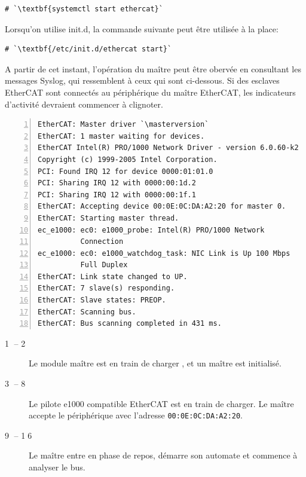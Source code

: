 \documentclass[a4paper,12pt,BCOR=6mm,bibtotoc,idxtotoc]{scrbook}
\newcommand{\masterversion}{1.5.2}
\newcommand{\linenum}[1]{\normalfont\textcircled{\tiny #1}}
\begin{document}
\begin{lstlisting}
# `\textbf{systemctl start ethercat}`
\end{lstlisting}

Lorsqu'on utilise init.d, la commande suivante peut \^etre utilis\'ee
\`a la place:

\begin{lstlisting}
# `\textbf{/etc/init.d/ethercat start}`
\end{lstlisting}

A partir de cet instant, l'op\'eration du ma\^itre peut \^etre oberv\'ee
en consultant les messages Syslog, qui ressemblent \`a
ceux qui sont ci-dessous. Si des esclaves EtherCAT sont connect\'es
au p\'eriph\'erique du ma\^itre EtherCAT, les indicateurs d'activit\'e
devraient commencer \`a clignoter.

\begin{lstlisting}[numbers=left]
EtherCAT: Master driver `\masterversion`
EtherCAT: 1 master waiting for devices.
EtherCAT Intel(R) PRO/1000 Network Driver - version 6.0.60-k2
Copyright (c) 1999-2005 Intel Corporation.
PCI: Found IRQ 12 for device 0000:01:01.0
PCI: Sharing IRQ 12 with 0000:00:1d.2
PCI: Sharing IRQ 12 with 0000:00:1f.1
EtherCAT: Accepting device 00:0E:0C:DA:A2:20 for master 0.
EtherCAT: Starting master thread.
ec_e1000: ec0: e1000_probe: Intel(R) PRO/1000 Network
          Connection
ec_e1000: ec0: e1000_watchdog_task: NIC Link is Up 100 Mbps
          Full Duplex
EtherCAT: Link state changed to UP.
EtherCAT: 7 slave(s) responding.
EtherCAT: Slave states: PREOP.
EtherCAT: Scanning bus.
EtherCAT: Bus scanning completed in 431 ms.
\end{lstlisting}

\begin{description}

\item[\linenum{1} -- \linenum{2}] Le module ma\^itre est en train de charger , et un ma\^itre est initialis\'e.

\item[\linenum{3} -- \linenum{8}] Le pilote e1000 compatible EtherCAT
  est en train de charger. Le ma\^itre accepte le p\'eriph\'erique avec
  l'adresse \lstinline+00:0E:0C:DA:A2:20+.

\item[\linenum{9} -- \linenum{16}] Le ma\^itre entre en phase de repos,
  d\'emarre son automate et commence \`a analyser le bus.

\end{description}
\end{document}
